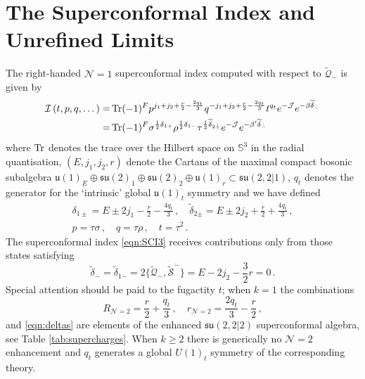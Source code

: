 \documentclass[main.tex]{subfiles}
\begin{document}
\section{The Superconformal Index and Unrefined Limits}
The right-handed $\mathcal{N}=1$ superconformal index computed with respect to $\widetilde{\mathcal{Q}}_{\dot-}$ is given by \cite{Kinney:2005ej,Romelsberger:2005eg}
\begin{equation}
\begin{aligned}
\label{eqn:SCI3}
\mathcal{I}\left(t,p,q,\dots\right)=&\operatorname{Tr}(-1)^Fp^{j_1+j_2+\frac{r}{2}-\frac{2q_t}{3}}q^{-j_1+j_2+\frac{r}{2}-\frac{2q_t}{3}}t^{q_{t}}e^{-\mathcal{J}}e^{-\beta\widetilde{\delta}_{\dot-}}\\
=&\operatorname{Tr}(-1)^F\sigma^{\frac{1}{2}\delta_{1+}}\rho^{\frac{1}{2}\delta_{1-}}\tau^{\frac{1}{2}\widetilde{\delta}_{2\dot+}}e^{-\mathcal{J}}e^{-\beta'\widetilde{\delta}_{\dot-}}
\end{aligned}
\end{equation}
where $\operatorname{Tr}$ denotes the trace over the Hilbert space on $\mathbb{S}^3$ in the radial quantisation, $(E,j_1,j_2,r)$ denote the Cartans of the maximal compact bosonic subalgebra $\mathfrak{u}(1)_E\oplus\mathfrak{su}(2)_1\oplus\mathfrak{su}(2)_2\oplus \mathfrak{u}(1)_{r}\subset\mathfrak{su}(2,2|1)$, $q_t$ denotes the generator for the `intrinsic' global $\mathfrak{u}(1)_t$ symmetry and we have defined
\begin{gather}\label{eqn:deltas} 
\delta_{1\pm}=E\pm2j_1-\frac{r}{2}-\frac{4q_t}{3}\,,\quad \widetilde{\delta}_{2\dot\pm}=E\pm2j_2+\frac{r}{2}+\frac{4q_t}{3}\,,\\
\label{eqn:newparam}
p=\tau\sigma\,,\quad q=\tau\rho\,,\quad t=\tau^2\,.
\end{gather}
The superconformal index \eqref{eqn:SCI3} receives contributions only from those states satisfying
\begin{equation}\label{eqn:BPS2}
\widetilde{\delta}_{\dot-}=\widetilde{\delta}_{1\dot-}=2\{\widetilde{\mathcal{Q}}_{\dot-},\widetilde{\mathcal{S}}^{\dot-}\}=E-2j_2-\frac{3}{2}r=0\,.
\end{equation}
Special attention should be paid to the fugactity $t$; when $k=1$ the combinations 
\begin{equation}\label{eqn:Neq2Neq1embed}
R_{\mathcal{N}=2}=\frac{r}{2}+\frac{q_t}{3}\,,\quad r_{\mathcal{N}=2}=\frac{2q_t}{3}-\frac{r}{2}\,,
\end{equation} 
and \eqref{eqn:deltas} are elements of the enhanced $\mathfrak{su}(2,2|2)$ superconformal algebra, see Table \ref{tab:supercharges}. When $k\geq2$ there is generically no $\mathcal{N}=2$ enhancement and $q_{t}$ generates a global $U(1)_{t}$ symmetry of the corresponding theory.
\end{document}
